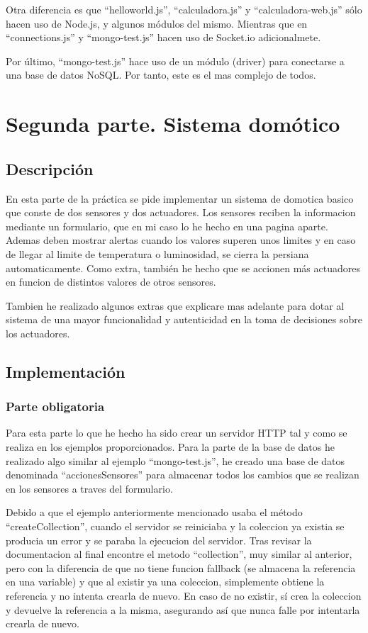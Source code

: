 \documentclass{article}
\begin{document}
Otra diferencia es que ``helloworld.js'', ``calculadora.js'' y ``calculadora-web.js'' sólo hacen uso de Node.js, y algunos módulos del mismo. Mientras que en ``connections.js'' y ``mongo-test.js'' hacen uso de Socket.io adicionalmete.

Por último, ``mongo-test.js'' hace uso de un módulo (driver) para conectarse a una base de datos NoSQL. Por tanto, este es el mas complejo de todos.

\section{Segunda parte. Sistema domótico}
\subsection{Descripción}
En esta parte de la práctica se pide implementar un sistema de domotica basico que conste de dos sensores y dos actuadores. Los sensores reciben la informacion mediante un formulario, que en mi caso lo he hecho en una pagina aparte. Ademas deben mostrar alertas cuando los valores superen unos limites y en caso de llegar al limite de temperatura o luminosidad, se cierra la persiana automaticamente. Como extra, también he hecho que se accionen más actuadores en funcion de distintos valores de otros sensores.

Tambien he realizado algunos extras que explicare mas adelante para dotar al sistema de una mayor funcionalidad y autenticidad en la toma de decisiones sobre los actuadores.

\subsection{Implementación}
\subsubsection{Parte obligatoria}
Para esta parte lo que he hecho ha sido crear un servidor HTTP tal y como se realiza en los ejemplos proporcionados. Para la parte de la base de datos he realizado algo similar al ejemplo ``mongo-test.js'', he creado una base de datos denominada ``accionesSensores'' para almacenar todos los cambios que se realizan en los sensores a traves del formulario.

Debido a que el ejemplo anteriormente mencionado usaba el método ``createCollection'', cuando el servidor se reiniciaba y la coleccion ya existia se producia un error y se paraba la ejecucion del servidor. Tras revisar la documentacion al final encontre el metodo ``collection'', muy similar al anterior, pero con la diferencia de que no tiene funcion fallback (se almacena la referencia en una variable) y que al existir ya una coleccion, simplemente obtiene la referencia y no intenta crearla de nuevo. En caso de no existir, sí crea la coleccion y devuelve la referencia a la misma, asegurando así que nunca falle por intentarla crearla de nuevo.
\end{document}
